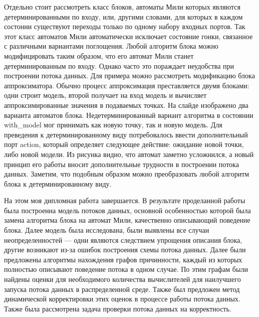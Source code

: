 \documentclass[10pt,a4paper,onecolumn]{report}
\begin{document}
  Отдельно стоит рассмотреть класс блоков, автоматы Мили которых являются детерминированными по входу, или, другими словами, для которых в каждом состонии существуют переходы только
  по одному набору входных портов. Так этот класс автоматов Мили автоматически исключает состояние гонки, связанное с различными вариантами поглощения.
  Любой алгоритм блока можно модифицировать таким образом, что его автомат Мили станет детерминированным по входу. Однако часто это пораждает неудобства при построении потока данных.
  Для примера можно рассмотреть модификацию блока аппроксиматора. Обычно процесс аппроксимация преставляется двумя блоками: одни строит модель, второй получает на вход модель
  и вычисляет аппроксимированные значения в подаваемых точках. На слайде изображено два варианта автоматов блока. Недетерминированный вариант алгоритма в состоянии with\_model
  мог принимать как новую точку, так и новую модель. Для преведения к детерминированному виду потребовалось ввести дополнительный порт action, который определяет следующее действие:
  ожидание новой точки, либо новой модели. Из рисунка видно, что автомат заметно усложнился, а новый принцип его работы вносит дополнительные трудности в построении потока данных.
  Заметим, что подобным образом можно преобразовать любой алгоритм блока к детерминированному виду.
  
  На этом моя дипломная работа завершается.
  В результате проделанной работы была построенна модель потоков данных, основной особенностью которой была замена алгоритма блока на автомат Мили,
  качественно описывающий поведение блока.
  Далее модель была исследована, были выявлены все случаи неопределенностей --- одни являются следствием упрощения описания блока, другие возникают из-за ошибок
  построения схемы потока данных.
  Далее были предложены алгоритмы нахождения графов причинности, каждый из которых полностью описывают поведение потока в одном случае. По этим
  графам были найдены оценки для необходимого количества вычислителей для наилучшего запуска потока данных в распределенной среде.
  Также был предложен метод динамической корректировки этих оценок в процессе работы потока данных.
  Также была рассмотрена задача проверки потока данных на корректность.
  
\end{document}
